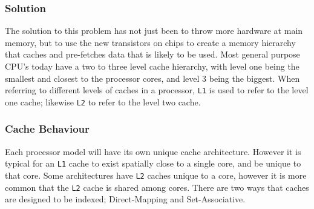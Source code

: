 \documentclass[bsc,frontabs,twoside,singlespacing,parskip,deptreport]{infthesis}     %
\begin{document}
\subsubsection{Solution}
The solution to this problem has not just been to throw more hardware at main memory, but to use the new transistors on chips to create a memory hierarchy that caches and pre-fetches data that is likely to be used. Most general purpose CPU's today have a two to three level cache hierarchy, with level one being the smallest and closest to the processor cores, and level 3 being the biggest. When referring to different levels of caches in a processor, \texttt{L1} is used to refer to the level one cache; likewise \texttt{L2} to refer to the level two cache.
\par
\subsubsection{Cache Behaviour}
Each processor model will have its own unique cache architecture. However it is typical for an \texttt{L1} cache to exist spatially close to a single core, and be unique to that core. Some architectures have \texttt{L2} caches unique to a core, however it is more common that the \texttt{L2} cache is shared among cores. There are two ways that caches are designed to be indexed; Direct-Mapping and Set-Associative.
\end{document}

